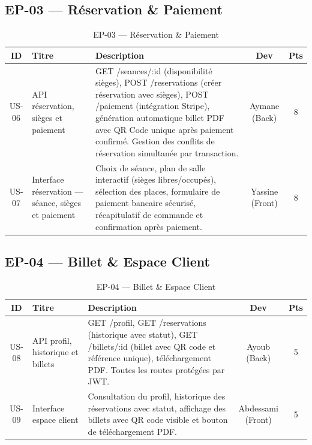 \documentclass[12pt]{report}
\begin{document}
\subsection*{EP-03 — Réservation \& Paiement}
 
\begin{table}[H]
\centering
\renewcommand{\arraystretch}{1.45}
\begin{tabular}{|c|p{3.8cm}|p{6.2cm}|c|c|}
\hline
\rowcolor{gray!20}
\textbf{ID} & \textbf{Titre} & \textbf{Description}
            & \textbf{Dev} & \textbf{Pts} \\
\hline
US-06 &
API réservation, sièges et paiement &
GET /seances/:id (disponibilité sièges),
POST /reservations (créer réservation avec sièges),
POST /paiement (intégration Stripe),
génération automatique billet PDF avec QR Code unique
après paiement confirmé. Gestion des conflits
de réservation simultanée par transaction. &
Aymane (Back) & 8 \\
\hline
US-07 &
Interface réservation — séance, sièges et paiement &
Choix de séance, plan de salle interactif
(sièges libres/occupés), sélection des places,
formulaire de paiement bancaire sécurisé,
récapitulatif de commande et confirmation après paiement. &
Yassine (Front) & 8 \\
\hline
\end{tabular}
\caption{EP-03 — Réservation \& Paiement}
\label{tab:ep03}
\end{table}
 
\subsection*{EP-04 — Billet \& Espace Client}
 
\begin{table}[H]
\centering
\renewcommand{\arraystretch}{1.45}
\begin{tabular}{|c|p{3.8cm}|p{6.2cm}|c|c|}
\hline
\rowcolor{gray!20}
\textbf{ID} & \textbf{Titre} & \textbf{Description}
            & \textbf{Dev} & \textbf{Pts} \\
\hline
US-08 &
API profil, historique et billets &
GET /profil, GET /reservations (historique avec statut),
GET /billets/:id (billet avec QR code et référence unique),
téléchargement PDF. Toutes les routes protégées par JWT. &
Ayoub (Back) & 5 \\
\hline
US-09 &
Interface espace client &
Consultation du profil, historique des réservations
avec statut, affichage des billets avec QR code visible
et bouton de téléchargement PDF. &
Abdessami (Front) & 5 \\
\hline
\end{tabular}
\caption{EP-04 — Billet \& Espace Client}
\label{tab:ep04}
\end{table}
 
\end{document}

